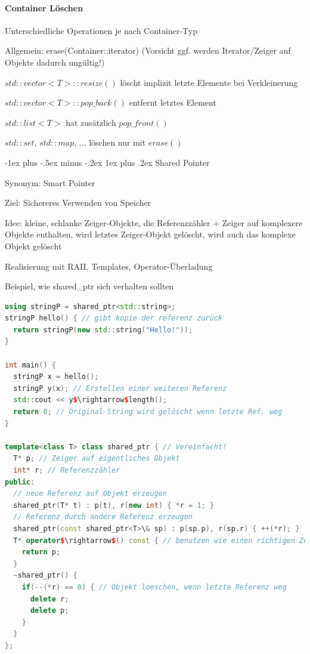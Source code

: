 \documentclass[10pt]{article}
\makeatletter
\renewcommand{\subsubsection}{\@startsection{subsubsection}{3}{0mm}%
                                {-1ex plus -.5ex minus -.2ex}%
                                {1ex plus .2ex}%
                                {\normalfont\small\bfseries}}
\makeatother
\begin{document}
\paragraph{Container Löschen}

\begin{itemize*}
  \item Unterschiedliche Operationen je nach Container-Typ
  \item Allgemein: erase(Container::iterator) (Vorsicht ggf. werden Iterator/Zeiger auf Objekte dadurch ungültig!)
  \item $std::vector<T>::resize()$ löscht implizit letzte Elemente bei Verkleinerung
  \item $std::vector<T>::pop\_back()$ entfernt letztes Element
  \item $std::list<T>$ hat zusätzlich $pop\_front()$
  \item $std::set$, $std::map$, ... löschen nur mit $erase()$
\end{itemize*}

\subsubsection{Shared Pointer}
\begin{itemize*}
  \item Synonym: Smart Pointer
  \item Ziel: Sichereres Verwenden von Speicher
  \item Idee: kleine, schlanke Zeiger-Objekte, die Referenzzähler + Zeiger auf komplexere Objekte enthalten, wird letztes Zeiger-Objekt gelöscht, wird auch das komplexe Objekt gelöscht
  \item Realisierung mit RAII, Templates, Operator-Überladung
  \item Beispiel, wie shared\_ptr sich verhalten sollten
\end{itemize*}
\begin{lstlisting}[language=C++]
using stringP = shared_ptr<std::string>;
stringP hello() { // gibt kopie der referenz zurück
  return stringP(new std::string("Hello!"));
}

int main() {
  stringP x = hello();
  stringP y(x); // Erstellen einer weiteren Referenz
  std::cout << y$\rightarrow$length();
  return 0; // Original-String wird gelöscht wenn letzte Ref. weg
}

template<class T> class shared_ptr { // Vereinfacht!
  T* p; // Zeiger auf eigentliches Objekt
  int* r; // Referenzzähler
public:
  // neue Referenz auf Objekt erzeugen
  shared_ptr(T* t) : p(t), r(new int) { *r = 1; }
  // Referenz durch andere Referenz erzeugen
  shared_ptr(const shared_ptr<T>\& sp) : p(sp.p), r(sp.r) { ++(*r); }
  T* operator$\rightarrow$() const { // benutzen wie einen richtigen Zeiger
    return p;
  }
  ~shared_ptr() {
    if(--(*r) == 0) { // Objekt loeschen, wenn letzte Referenz weg
      delete r;
      delete p;
    }
  }
};
\end{lstlisting}
\end{document}
